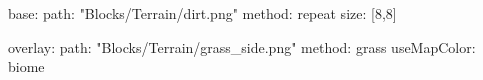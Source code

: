 base:
  path: "Blocks/Terrain/dirt.png"
  method: repeat
  size: [8,8]

overlay:
  path: "Blocks/Terrain/grass_side.png"
  method: grass
  useMapColor: biome